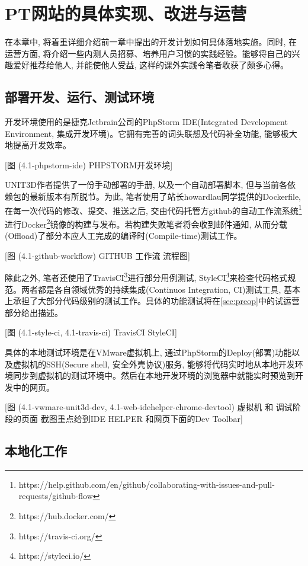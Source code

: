 \chapter{PT网站的具体实现、改进与运营}
\label{cha:experiment}

在本章中, 将着重详细介绍前一章中提出的开发计划如何具体落地实施。同时, 在运营方面, 将介绍一些内测人员招募、培养用户习惯的实践经验。能够将自己的兴趣爱好推荐给他人, 并能使他人受益, 这样的课外实践令笔者收获了颇多心得。

\section{部署开发、运行、测试环境}

开发环境使用的是捷克Jetbrain公司的PhpStorm IDE(Integrated Development Environment, 集成开发环境)。它拥有完善的词头联想及代码补全功能, 能够极大地提高开发效率。

[图 (4.1-phpstorm-ide) PHPSTORM开发环境]

UNIT3D作者提供了一份手动部署的手册, 以及一个自动部署脚本, 但与当前各依赖包的最新版本有所脱节。为此, 笔者使用了站长howardlau同学提供的Dockerfile, 在每一次代码的修改、提交、推送之后, 交由代码托管方github的自动工作流系统\footnote{https://help.github.com/en/github/collaborating-with-issues-and-pull-requests/github-flow}进行Docker\footnote{https://hub.docker.com/}镜像的构建与发布。若构建失败笔者将会收到邮件通知, 从而分载(Offload)了部分本应人工完成的编译时(Compile-time)测试工作。

[图 (4.1-github-workflow) GITHUB 工作流 流程图]

除此之外, 笔者还使用了TravisCI\footnote{https://travis-ci.org/}进行部分用例测试, StyleCI\footnote{https://styleci.io/}来检查代码格式规范。两者都是各自领域优秀的持续集成(Continuos Integration, CI)测试工具, 基本上承担了大部分代码级别的测试工作。具体的功能测试将在\ref{sec:preop}中的试运营部分给出描述。

[图 (4.1-style-ci, 4.1-travis-ci) TravisCI StyleCI]

具体的本地测试环境是在VMware虚拟机上, 通过PhpStorm的Deploy(部署)功能以及虚拟机的SSH(Secure shell, 安全外壳协议)服务, 能够将代码实时地从本地开发环境同步到虚拟机的测试环境中。然后在本地开发环境的浏览器中就能实时预览到开发中的网页。

[图 (4.1-vwmare-unit3d-dev, 4.1-web-idehelper-chrome-devtool) 虚拟机 和 调试阶段的页面 截图重点给到IDE HELPER 和网页下面的Dev Toolbar]

\section{本地化工作}

